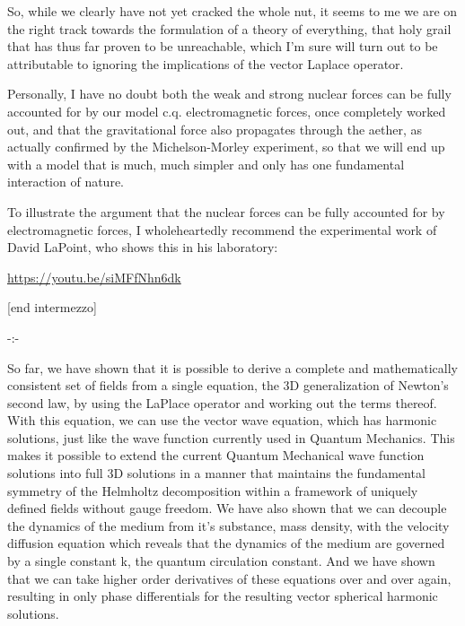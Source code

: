 \documentclass[a4paper]{article}
\newcommand\textstyleNone[1]{#1}
\begin{document}
{\color[rgb]{0.101960786,0.101960786,0.101960786}
\textstyleNone{So, while we clearly have not yet cracked the whole nut, it seems to me we are on the right track towards
the formulation of a {\textquotedbl}theory of everything{\textquotedbl}, that holy grail that has thus far proven to be
unreachable, which I'm sure will turn out to be attributable to ignoring the implications of the vector Laplace
operator.}}

{\color[rgb]{0.101960786,0.101960786,0.101960786}
\textstyleNone{Personally, I have no doubt both the weak and strong nuclear forces can be fully accounted for by our
model c.q. electromagnetic forces, once completely worked out, and that the gravitational force also propagates through
the aether, as actually confirmed by the Michelson-Morley experiment, so that we will end up with a model that is much,
much simpler and only has one fundamental interaction of nature. }}

{\color[rgb]{0.101960786,0.101960786,0.101960786}
\textstyleNone{To illustrate the argument that the nuclear forces can be fully accounted for by electromagnetic forces,
I wholeheartedly recommend the experimental work of David LaPoint, who shows this in his laboratory:}}

{\color[rgb]{0.101960786,0.101960786,0.101960786}
\url{https://youtu.be/siMFfNhn6dk}\textstyleNone{  }}

{\color[rgb]{0.101960786,0.101960786,0.101960786}
\textstyleNone{[end intermezzo]}}

{\centering\color[rgb]{0.101960786,0.101960786,0.101960786}
\textstyleNone{{}-:-}
\par}

{\color[rgb]{0.101960786,0.101960786,0.101960786}
\textstyleNone{So far, we have shown that it is possible to derive a complete and mathematically consistent set of
fields from a single equation, the 3D generalization of Newton's second law, by using the LaPlace operator and working
out the terms thereof. With this equation, we can use the vector wave equation, which has harmonic solutions, just like
the wave function currently used in Quantum Mechanics. This makes it possible to extend the current Quantum Mechanical
wave function solutions into full 3D solutions in a manner that maintains the fundamental symmetry of the Helmholtz
decomposition within a framework of uniquely defined fields without gauge freedom. We have also shown that we can
decouple the dynamics of the medium from it's substance, mass density, with the velocity diffusion equation which
reveals that the dynamics of the medium are governed by a single constant }\textstyleNone{k}\textstyleNone{, the
quantum circulation constant. And we have shown that we can take higher order derivatives of these equations over and
over again, resulting in only phase differentials for the resulting vector spherical harmonic solutions.}}
\end{document}
